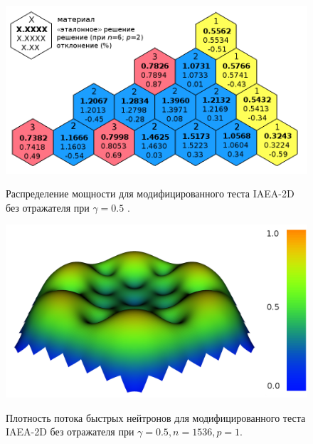 \begin{figure}[H]
	\includegraphics[width=0.85\linewidth]{power_iaea_05_6_2.png}\\
	\caption{\label{image:canonsummary}Распределение мощности для модифицированного теста IAEA-2D без отражателя при $\gamma=0.5$ .}
	\label{ris:power1}
\end{figure}

\begin{figure}[H]
	\includegraphics[width=0.85\linewidth]{power.png}\\
	\caption{\label{image:canonsummary}Плотность потока быстрых нейтронов для модифицированного теста IAEA-2D без отражателя при $\gamma=0.5, n=1536, p=1$.}
	\label{ris:power}
\end{figure}

